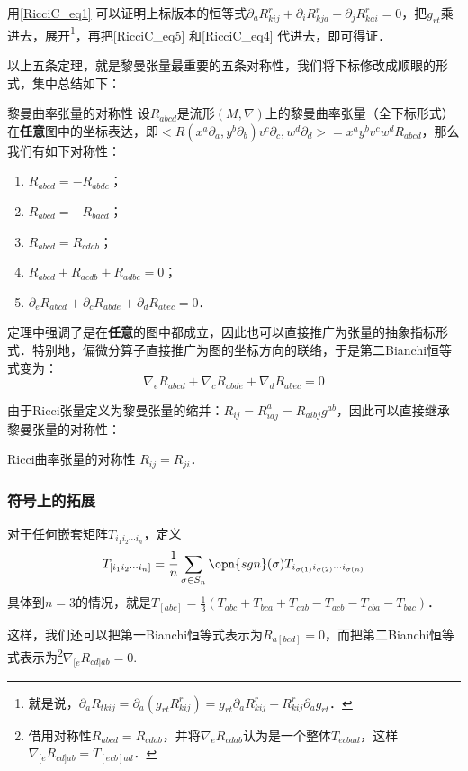 用\autoref{RicciC_eq1} 可以证明上标版本的恒等式$\partial_aR_{kij}^r+\partial_iR_{kja}^r+\partial_jR_{kai}^r=0$，把$g_{rt}$乘进去，展开\footnote{就是说，$\partial_aR_{tkij}=\partial_a(g_{rt}R^{r}_{kij})=g_{rt}\partial_aR^r_{kij}+R^r_{kij}\partial_ag_{rt}$．}，再把\autoref{RicciC_eq5} 和\autoref{RicciC_eq4} 代进去，即可得证．


以上五条定理，就是黎曼张量最重要的五条对称性，我们将下标修改成顺眼的形式，集中总结如下：

\begin{theorem}{黎曼曲率张量的对称性}
设$R_{abcd}$是流形$(M, \nabla)$上的黎曼曲率张量（全下标形式）在\textbf{任意}图中的坐标表达，即$<R(x^a\partial_a, y^b\partial_b)v^c\partial_c, w^d\partial_d>=x^ay^bv^cw^dR_{abcd}$，那么我们有如下对称性：
\begin{enumerate}
\item $R_{abcd}=-R_{abdc}$；
\item $R_{abcd}=-R_{bacd}$；
\item $R_{abcd}=R_{cdab}$；
\item $R_{abcd}+R_{acdb}+R_{adbc}=0$；
\item $\partial_eR_{abcd}+\partial_cR_{abde}+\partial_dR_{abec}=0$．
\end{enumerate}
\end{theorem}

定理中强调了是在\textbf{任意}的图中都成立，因此也可以直接推广为张量的抽象指标形式．特别地，偏微分算子直接推广为图的坐标方向的联络，于是第二Bianchi恒等式变为：
\begin{equation}\label{RicciC_eq8}
\nabla_eR_{abcd}+\nabla_cR_{abde}+\nabla_dR_{abec}=0
\end{equation}

由于Ricci张量定义为黎曼张量的缩并：$R_{ij}=R^a_{iaj}=R_{aibj}g^{ab}$，因此可以直接继承黎曼张量的对称性：

\begin{theorem}{Ricci曲率张量的对称性}
$R_{ij}=R_{ji}$．
\end{theorem}

\subsubsection{符号上的拓展}

对于任何嵌套矩阵$T_{i_1i_2\cdots i_n}$，定义
\begin{equation}
T_{[i_1i_2\cdots i_n]}=\frac{1}{n}\sum\limits_{\sigma\in S_n}\opn{sgn}(\sigma)T_{i_{\sigma(1)}i_{\sigma(2)}\cdots i_{\sigma(n)}}
\end{equation}
具体到$n=3$的情况，就是$T_{[abc]}=\frac{1}{3}(T_{abc}+T_{bca}+T_{cab}-T_{acb}-T_{cba}-T_{bac})$．





这样，我们还可以把第一Bianchi恒等式表示为$R_{a[bcd]}=0$，而把第二Bianchi恒等式表示为\footnote{借用对称性$R_{abcd}=R_{cdab}$，并将$\nabla_eR_{cdab}$认为是一个整体$T_{ecbad}$，这样$\nabla_{[e}R_{cd]ab}=T_{[ecb]ad}$．}$\nabla_{[e}R_{cd]ab}=0$.








